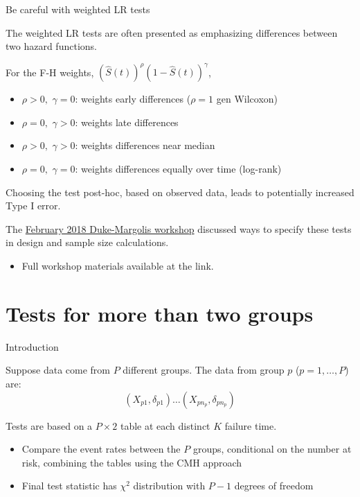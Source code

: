 \documentclass[ignorenonframetext,]{beamer}
\providecommand{\tightlist}{%
  \setlength{\itemsep}{0pt}\setlength{\parskip}{0pt}}
\begin{document}
\begin{frame}{%
\protect\hypertarget{be-careful-with-weighted-lr-tests}{%
Be careful with weighted LR tests}}

The weighted LR tests are often presented as emphasizing differences
between two hazard functions.

For the F-H weights,
\((\widehat{S}(t))^\rho(1 - \widehat{S}(t))^\gamma\),

\begin{itemize}
\item
  \(\rho > 0,\,\, \gamma = 0\): weights early differences (\(\rho = 1\)
  gen Wilcoxon)
\item
  \(\rho = 0,\,\, \gamma > 0\): weights late differences
\item
  \(\rho > 0,\,\, \gamma > 0\): weights differences near median
\item
  \(\rho = 0,\,\, \gamma = 0\): weights differences equally over time
  (log-rank)
\end{itemize}

Choosing the test post-hoc, based on observed data, leads to potentially
increased Type I error.

The
\href{https://healthpolicy.duke.edu/events/public-workshop-oncology-clinical-trials-presence-non-proportional-hazards}{February
2018 Duke-Margolis workshop} discussed ways to specify these tests in
design and sample size calculations.

\begin{itemize}
\tightlist
\item
  Full workshop materials available at the link.
\end{itemize}

\end{frame}

\hypertarget{tests-for-more-than-two-groups}{%
\section{Tests for more than two
groups}\label{tests-for-more-than-two-groups}}

\begin{frame}{%
\protect\hypertarget{introduction-1}{%
Introduction}}

Suppose data come from \(P\) different groups. The data from group \(p\)
(\(p=1,\ldots,P\)) are: \[ (X_{p1},\delta_{p1}) \dots
(X_{p n_p},\delta_{p n_p}) \]

Tests are based on a \(P \times 2\) table at each distinct \(K\) failure
time.

\begin{itemize}
\item
  Compare the event rates between the \(P\) groups, conditional on the
  number at risk, combining the tables using the CMH approach
\item
  Final test statistic has \(\chi^2\) distribution with \(P - 1\)
  degrees of freedom
\end{itemize}

\end{frame}
\end{document}
